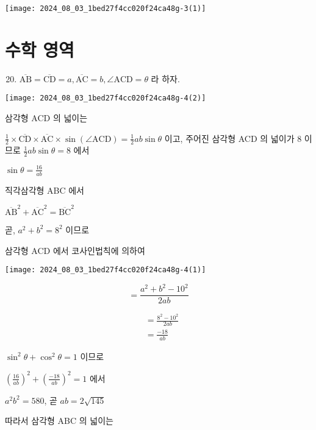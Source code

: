 \documentclass[10pt]{article}
\begin{document}
\begin{center}
\texttt{[image: 2024\_08\_03\_1bed27f4cc020f24ca48g-3(1)]}
\end{center}

\section*{수학 영역}
\begin{enumerate}
  \setcounter{enumi}{19}
  \item \(\overline{\mathrm{AB}}=\overline{\mathrm{CD}}=a, \overline{\mathrm{AC}}=b, \angle \mathrm{ACD}=\theta\) 라 하자.
\end{enumerate}

\begin{center}
\texttt{[image: 2024\_08\_03\_1bed27f4cc020f24ca48g-4(2)]}
\end{center}

삼각형 ACD 의 넓이는

\(\frac{1}{2} \times \overline{\mathrm{CD}} \times \overline{\mathrm{AC}} \times \sin (\angle \mathrm{ACD})=\frac{1}{2} a b \sin \theta\) 이고, 주어진 삼각형 ACD 의 넓이가 8 이므로 \(\frac{1}{2} a b \sin \theta=8\) 에서

\(\sin \theta=\frac{16}{a b}\)

직각삼각형 ABC 에서

\(\overline{\mathrm{AB}}^{2}+\overline{\mathrm{AC}}^{2}=\overline{\mathrm{BC}}^{2}\)

곧, \(a^{2}+b^{2}=8^{2}\) 이므로

삼각형 ACD 에서 코사인법칙에 의하여

\begin{center}
\texttt{[image: 2024\_08\_03\_1bed27f4cc020f24ca48g-4(1)]}
\end{center}

\[
=\frac{a^{2}+b^{2}-10^{2}}{2 a b}
\]

\[
\begin{aligned}
& =\frac{8^{2}-10^{2}}{2 a b} \\
& =\frac{-18}{a b}
\end{aligned}
\]

\(\sin ^{2} \theta+\cos ^{2} \theta=1\) 이므로

\(\left(\frac{16}{a b}\right)^{2}+\left(\frac{-18}{a b}\right)^{2}=1\) 에서

\(a^{2} b^{2}=580\), 곧 \(a b=2 \sqrt{145}\)

따라서 삼각형 ABC 의 넓이는
\end{document}
